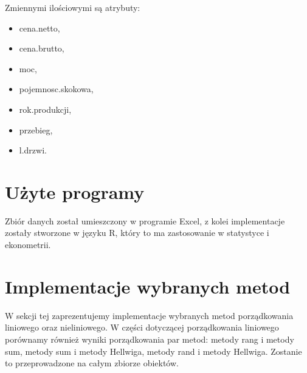 \documentclass[12pt,a4paper]{report}
\begin{document}
Zmiennymi ilościowymi są atrybuty:
\begin{multicols}{3}
\begin{itemize}
 \item cena.netto,%
 \item cena.brutto,%
 \item moc,%
 \item pojemnosc.skokowa,%
 \item rok.produkcji, %
 \item przebieg,%
 \item l.drzwi. %
\end{itemize}
\end{multicols}

%

\section{Użyte programy}
Zbiór danych został umieszczony w programie Excel, z kolei implementacje zostały stworzone w języku R, który to ma zastosowanie w statystyce i ekonometrii. 


\section{Implementacje wybranych metod}
W sekcji tej zaprezentujemy implementacje wybranych metod porządkowania liniowego oraz nieliniowego. W części dotyczącej porządkowania liniowego porównamy również wyniki porządkowania par metod: metody rang i metody sum, metody sum i metody Hellwiga, metody rand i metody Hellwiga. Zostanie to przeprowadzone na całym zbiorze obiektów. 
\end{document}
